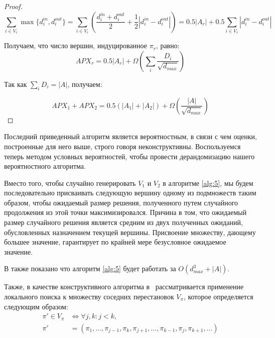 \begin{proof}
    \[
        \sum\limits_{i \in V_r}\max\{d_i^{in}, d_i^{out}\} = 
        \sum\limits_{i \in V_r}\left(\dfrac{d_i^{in} + d_i^{out}}{2} + 
        \dfrac{1}{2} |d_i^{in} - d_i^{out}|\right) = 
        0.5|A_r| + 0.5\sum\limits_{i\in V_r}|d_i^{in} - d_i^{out}|
    \]

    Получаем, что число вершин, индуцированное $\pi_r$, равно:
    \[
        APX_r = 0.5|A_r| + \Omega\left(\sum\limits_i
        \dfrac{D_i}{\sqrt{d_{max}}}\right)
    \]

    Так как $\sum_iD_i = |A|$, получаем:

    \[
        APX_1 + APX_2 = 0.5(|A_1| + |A_2|) + \Omega(\dfrac{|A|}{\sqrt{d_{max}}})
    \]
\end{proof}

Последний приведенный алгоритм является вероятностным, в связи с чем оценки,
построенные для него выше, строго говоря неконструктивны. 
Воспользуемся теперь методом условных вероятностей, чтобы провести 
дерандомизацию нашего вероятностного алгоритма.

\vspace{1ex}

Вместо того, чтобы случайно генерировать $V_1$ и $V_2$ в алгоритме \ref{alg:5},
мы будем последовательно присваивать следующую вершину одному из подмножеств
таким образом, чтобы ожидаемый размер решения, полученного путем случайного 
продолжения из этой точки максимизировался. Причина в том, что ожидаемый размер
случайного решения является средним из двух полученных ожиданий, обусловленных
назначением текущей вершины. Присвоение множеству, дающему большее значение,
гарантирует по крайней мере безусловное ожидаемое значение.

\vspace{1ex}

В \cite{rnd_alg} также показано что алгоритм \ref{alg:5} будет работать за 
$O(d_{max}^3 + |A|)$.

Также, в качестве конструктивного алгоритма в~\cite{rnd_alg} рассматривается 
применение локального поиска к множеству соседних перестановок $V_{\pi}$,
которое определяется следующим образом:
\begin{align*}
    \pi' \in V_{\pi} &\Leftrightarrow \forall j, k: j<k, \\
    \pi' &= (\pi_1, ..., \pi_{j-1}, \pi_k, \pi_{j+1}, ..., \pi_{k-1}, \pi_j,
    \pi_{k+1}, ...) \\
\end{align*}















